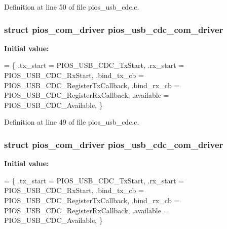 Definition at line 50 of file pios\-\_\-usb\-\_\-cdc.\-c.

\hypertarget{group___p_i_o_s___u_s_b___c_o_m_gad661bf144c28ea36f290b0092e6957e2}{
\subsubsection[{pios\-\_\-usb\-\_\-cdc\-\_\-com\-\_\-driver}]{\setlength{\rightskip}{0pt plus 5cm}struct {\bf pios\-\_\-com\-\_\-driver} pios\-\_\-usb\-\_\-cdc\-\_\-com\-\_\-driver}}\label{group___p_i_o_s___u_s_b___c_o_m_gad661bf144c28ea36f290b0092e6957e2}
{\bfseries Initial value\-:}
\begin{DoxyCode}
= \{
        .tx\_start    = PIOS\_USB\_CDC\_TxStart,
        .rx\_start    = PIOS\_USB\_CDC\_RxStart,
        .bind\_tx\_cb  = PIOS\_USB\_CDC\_RegisterTxCallback,
        .bind\_rx\_cb  = PIOS\_USB\_CDC\_RegisterRxCallback,
        .available   = PIOS\_USB\_CDC\_Available,
\}
\end{DoxyCode}


Definition at line 49 of file pios\-\_\-usb\-\_\-cdc.\-c.

\hypertarget{group___p_i_o_s___u_s_b___c_o_m_gad661bf144c28ea36f290b0092e6957e2}{
\subsubsection[{pios\-\_\-usb\-\_\-cdc\-\_\-com\-\_\-driver}]{\setlength{\rightskip}{0pt plus 5cm}struct {\bf pios\-\_\-com\-\_\-driver} pios\-\_\-usb\-\_\-cdc\-\_\-com\-\_\-driver}}\label{group___p_i_o_s___u_s_b___c_o_m_gad661bf144c28ea36f290b0092e6957e2}
{\bfseries Initial value\-:}
\begin{DoxyCode}
= \{
        .tx\_start    = PIOS\_USB\_CDC\_TxStart,
        .rx\_start    = PIOS\_USB\_CDC\_RxStart,
        .bind\_tx\_cb  = PIOS\_USB\_CDC\_RegisterTxCallback,
        .bind\_rx\_cb  = PIOS\_USB\_CDC\_RegisterRxCallback,
        .available   = PIOS\_USB\_CDC\_Available,
\}
\end{DoxyCode}


